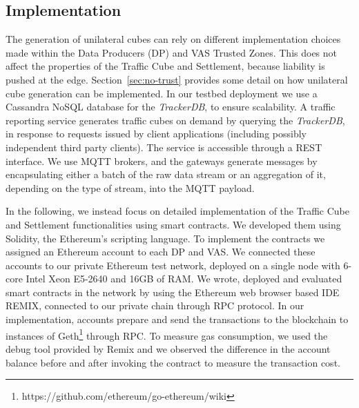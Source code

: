 \subsection{Implementation}
\label{sec:implementation}
The generation of unilateral cubes can rely on different implementation choices made within the Data Producers (DP) and VAS Trusted Zones. This does not affect the properties of the Traffic Cube and Settlement, because liability is pushed at the edge. Section~\ref{sec:no-trust} provides some detail on how unilateral cube generation can be implemented. 
In our testbed deployment we use a Cassandra NoSQL database for the \textit{TrackerDB}, to ensure scalability. 
A traffic reporting service generates traffic cubes on demand by querying the \textit{TrackerDB}, in response to requests issued by client applications (including possibly independent third party clients). The service is accessible through a REST interface.
We use MQTT brokers, and the gateways generate messages by encapsulating either a batch of the raw data stream or an aggregation of it, depending on the type of stream, into the MQTT payload.

In the following, we instead focus on detailed implementation of the Traffic Cube and Settlement functionalities using smart contracts. 
We developed them using Solidity, the Ethereum's scripting language. To implement the contracts we assigned an Ethereum account to each DP and VAS. We connected these accounts to our private Ethereum test network, deployed on a single node with 6-core Intel Xeon E5-2640 and 16GB of RAM. We wrote, deployed and evaluated smart contracts in the network by using the Ethereum web browser based IDE REMIX, connected to our private chain through RPC protocol. In our implementation, accounts prepare and send the transactions to the blockchain to instances of Geth\footnote{https://github.com/ethereum/go-ethereum/wiki } through RPC. To measure gas consumption, we used the debug tool provided by Remix and we observed the difference in the account balance before and after invoking the contract to measure the transaction cost.

